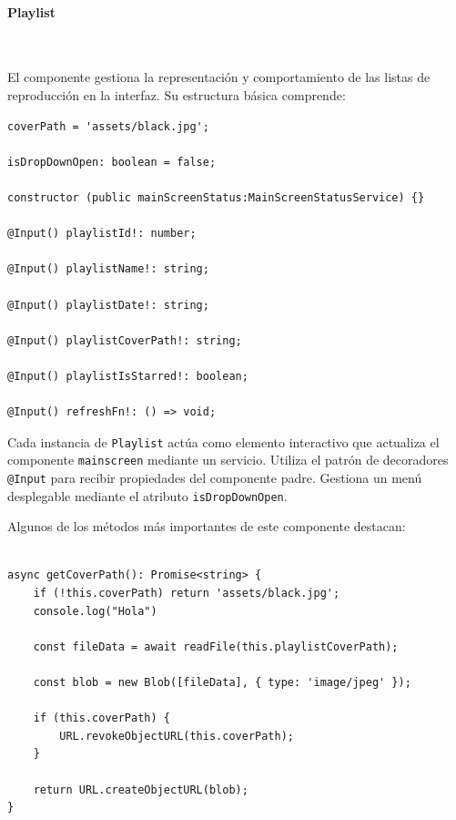 \documentclass[11pt, a4paper]{article}
\begin{document}
                \paragraph{Playlist}
                ‎ 

                El componente gestiona la representación y comportamiento de las listas de reproducción en la interfaz. Su estructura básica comprende:

                \begin{lstlisting}[caption={Atributos y Constructora Playlist}]
coverPath = 'assets/black.jpg';

isDropDownOpen: boolean = false;

constructor (public mainScreenStatus:MainScreenStatusService) {}

@Input() playlistId!: number;

@Input() playlistName!: string;

@Input() playlistDate!: string;

@Input() playlistCoverPath!: string;

@Input() playlistIsStarred!: boolean;

@Input() refreshFn!: () => void;
                \end{lstlisting}

                Cada instancia de \texttt{Playlist} actúa como elemento interactivo que actualiza el componente \texttt{mainscreen} mediante un servicio. Utiliza el patrón de decoradores \texttt{@Input} para recibir propiedades del componente padre. Gestiona un menú desplegable mediante el atributo \texttt{isDropDownOpen}.
                
                Algunos de los métodos más importantes de este componente destacan:

                \begin{lstlisting}[caption={getCoverPath()}]

async getCoverPath(): Promise<string> {
    if (!this.coverPath) return 'assets/black.jpg';
    console.log("Hola")

    const fileData = await readFile(this.playlistCoverPath);
        
    const blob = new Blob([fileData], { type: 'image/jpeg' });

    if (this.coverPath) {
        URL.revokeObjectURL(this.coverPath);
    }

    return URL.createObjectURL(blob);
}
                \end{lstlisting}
\end{document}

